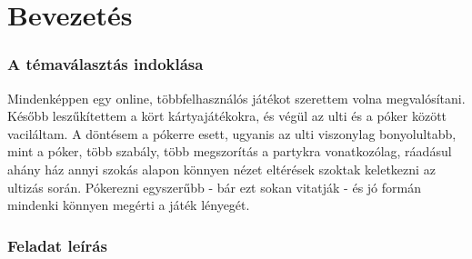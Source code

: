 \part{Bevezetés}

\section{A témaválasztás indoklása}
Mindenképpen egy online, többfelhasználós játékot szerettem volna megvalósítani. Később leszűkítettem a kört kártyajátékokra, és végül az ulti és a póker között vaciláltam. A döntésem a pókerre esett, ugyanis az ulti viszonylag bonyolultabb, mint a póker, több szabály, több megszorítás a partykra vonatkozólag, ráadásul ahány ház annyi szokás alapon könnyen nézet eltérések szoktak keletkezni az ultizás során. Pókerezni egyszerűbb - bár ezt sokan vitatják - és jó formán mindenki könnyen megérti a játék lényegét.

\section{Feladat leírás}

\cleardoublepage
